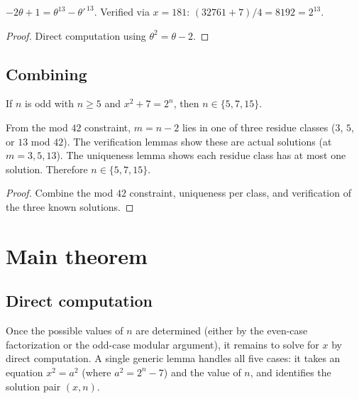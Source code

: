 \begin{lemma}[Verification: $m = 13$ (i.e.\ $n = 15$)]
  \label{lem:theta_eq_at_13}
  \leanok
  $-2\theta + 1 = \theta^{13} - \theta'^{\,13}$.
  Verified via $x = 181$: $(32761 + 7)/4 = 8192 = 2^{13}$.
\end{lemma}
\begin{proof}\leanok
  Direct computation using $\theta^2 = \theta - 2$.
\end{proof}

\subsection{Combining}

\begin{theorem}
  \label{thm:odd_case_only_three_values}
  \leanok
  If $n$ is odd with $n \geq 5$ and $x^2 + 7 = 2^n$, then $n \in \{5, 7, 15\}$.

  From the mod $42$ constraint, $m = n - 2$ lies in one of three residue classes
  ($3$, $5$, or $13$ mod $42$). The verification lemmas show these are actual solutions
  (at $m = 3, 5, 13$). The uniqueness lemma shows each residue class has at most one
  solution. Therefore $n \in \{5, 7, 15\}$.
\end{theorem}
\begin{proof}\leanok
  Combine the mod $42$ constraint, uniqueness per class, and verification of
  the three known solutions.
\end{proof}

\section{Main theorem}

\subsection{Direct computation}

Once the possible values of $n$ are determined (either by the even-case factorization or
the odd-case modular argument), it remains to solve for $x$ by direct computation.
A single generic lemma handles all five cases: it takes an equation $x^2 = a^2$
(where $a^2 = 2^n - 7$) and the value of $n$, and identifies the solution pair $(x, n)$.

